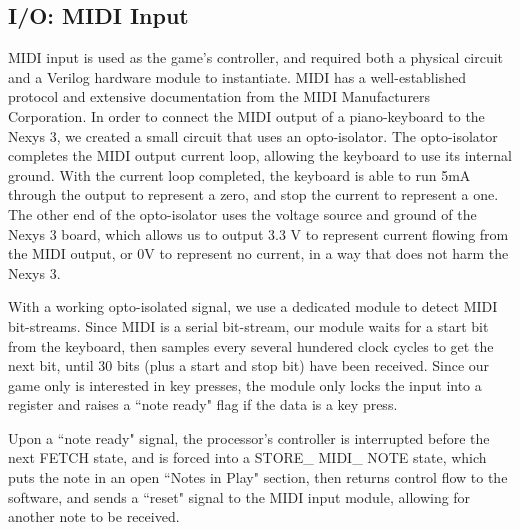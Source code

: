 \documentclass[onecolumn, 12pt]{IEEEtran}
\begin{document}
\subsection{I/O: MIDI Input}
MIDI input is used as the game's controller, and required both a physical circuit and a Verilog hardware module to instantiate.  MIDI has a well-established protocol and extensive documentation from the MIDI Manufacturers Corporation.  In order to connect the MIDI output of a piano-keyboard to the Nexys 3, we created a small circuit that uses an opto-isolator. The opto-isolator completes the MIDI output current loop, allowing the keyboard to use its internal ground.  With the current loop completed, the keyboard is able to run 5mA through the output to represent a zero, and stop the current to represent a one.  The other end of the opto-isolator uses the voltage source and ground of the Nexys 3 board, which allows us to output 3.3 V to represent current flowing from the MIDI output, or 0V to represent no current, in a way that does not harm the Nexys 3.
\par
With a working opto-isolated signal, we use a dedicated module to detect MIDI bit-streams.  Since MIDI is a serial bit-stream, our module waits for a start bit from the keyboard, then samples every several hundered clock cycles to get the next bit, until 30 bits (plus a start and stop bit) have been received.  Since our game only is interested in key presses, the module only locks the input into a register and raises a ``note ready" flag if the data is a key press.
\par
 Upon a ``note ready" signal, the processor's controller is interrupted before the next FETCH state, and is forced into a STORE\_ MIDI\_ NOTE state, which puts the note in an open ``Notes in Play" section, then returns control flow to the software, and sends a ``reset" signal to the MIDI input module, allowing for another note to be received.  
\end{document}
